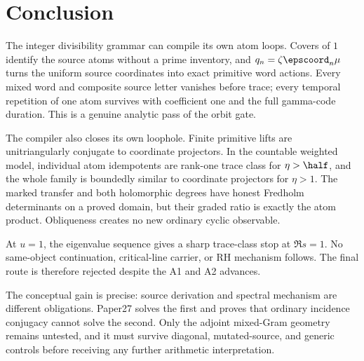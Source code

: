 \section{Conclusion}
\label{sec:conclusion}

The integer divisibility grammar can compile its own atom loops. Covers of
\(1\) identify the source atoms without a prime inventory, and
\(q_n=\zeta\epscoord_n\mu\) turns the uniform source coordinates into exact
primitive word actions. Every mixed word and composite source letter
vanishes before trace; every temporal repetition of one atom survives with
coefficient one and the full gamma-code duration. This is a genuine analytic
pass of the orbit gate.

The compiler also closes its own loophole. Finite primitive lifts are
unitriangularly conjugate to coordinate projectors. In the countable weighted
model, individual atom idempotents are rank-one trace class for
\(\eta>\half\), and the whole family is boundedly similar to coordinate
projectors for \(\eta>1\). The marked transfer and both holomorphic degrees
have honest Fredholm determinants on a proved domain, but their graded ratio
is exactly the atom product. Obliqueness creates no new ordinary cyclic
observable.

At \(u=1\), the eigenvalue sequence gives a sharp trace-class stop at
\(\Re s=1\). No same-object continuation, critical-line carrier, or RH
mechanism follows. The final route is therefore rejected despite the A1 and
A2 advances.

The conceptual gain is precise: source derivation and spectral mechanism are
different obligations. Paper27 solves the first and proves that ordinary
incidence conjugacy cannot solve the second. Only the adjoint mixed-Gram
geometry remains untested, and it must survive diagonal, mutated-source, and
generic controls before receiving any further arithmetic interpretation.
